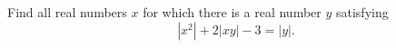 Find all real numbers $x$ for which there is a real number $y$ satisfying
\[
|x^2|+2|xy|-3=|y| .
\]
